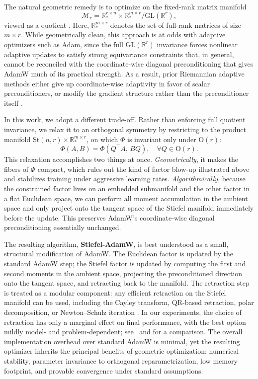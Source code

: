 \documentclass[11pt,a4paper]{article}
\numberwithin{equation}{section}
\newcommand{\algname}{Stiefel-AdamW}
\newcommand{\tr}{^{\top}} %
\newcommand{\cM}{{\mathcal M}}          %
\newcommand{\cMr}{\cM_{r}}              %
\newcommand{\Stnr}{\mathrm{St}(n,r)}    %
\newcommand{\R}{\mathbb{R}}
\theoremstyle{plain}
\theoremstyle{definition}
\theoremstyle{remark}
\begin{document}
The natural geometric remedy is to optimize on the fixed-rank matrix manifold 
\[
    \cMr = \R^{r \times n}_* \times \R^{m \times r}_* / \mathrm{GL}(\R^r),
\]
viewed as a quotient \cite{Mishra2014}. Here, $\R^{m \times r}_*$ denotes the set of full-rank matrices of size $m\times r$. While geometrically clean, this approach is at odds with adaptive optimizers such as Adam, since the full $\mathrm{GL}(\R^r)$ invariance forces nonlinear adaptive updates to satisfy strong equivariance constraints that, in general, cannot be reconciled with the coordinate-wise diagonal preconditioning that gives AdamW much of its practical strength. As a result, prior Riemannian adaptive methods either give up coordinate-wise adaptivity in favor of scalar preconditioners, or modify the gradient structure rather than the preconditioner itself \cite{BecigneulGanea:2019,sakai2025a,schotthoefer2025,
bian2025finding}.

In this work, we adopt a different trade-off. Rather than enforcing full quotient invariance, we relax it to an orthogonal symmetry by restricting to the product manifold $\Stnr \times \R^{m \times r}_*$, on which $\Phi$ is
invariant only under $\mathrm{O}(r)$:
\[
    \Phi(A,B) = \Phi(Q\tr\! A, \,BQ), \quad \forall Q \in \mathrm{O}(r).
\]
This relaxation accomplishes two things at once. \emph{Geometrically}, it makes the fibers of $\Phi$ compact, which rules out the kind of factor blow-up illustrated above and stabilizes training under aggressive learning rates. \emph{Algorithmically}, because the constrained factor lives on an embedded submanifold and the other factor in a flat Euclidean space, we can perform all moment accumulation in the ambient space and only project onto the tangent space of the Stiefel manifold immediately before the update. This preserves AdamW's coordinate-wise diagonal preconditioning essentially unchanged.

The resulting algorithm, \textbf{\algname}, is best understood as a small, structural modification of AdamW. The Euclidean factor is updated by the standard AdamW step; the Stiefel factor is updated by computing the first and second moments in the ambient space, projecting the preconditioned direction onto the tangent space, and retracting back to the manifold. The retraction step is treated as a modular component: any efficient retraction on the Stiefel manifold can be used, including the Cayley transform, QR-based retraction, polar decomposition, or Newton--Schulz iteration \cite{Kovarik1970SomeIM,BjorckBowie1971,Higham:2008}. In our experiments, the choice of retraction has only a marginal effect on final performance, with the best option mildly model- and problem-dependent; see~ and  for a comparison. The overall implementation overhead over standard AdamW is minimal, yet the resulting optimizer inherits the principal benefits of geometric optimization: numerical stability, parameter invariance to orthogonal reparametrization, low memory footprint, and provable convergence under standard assumptions.
\end{document}
